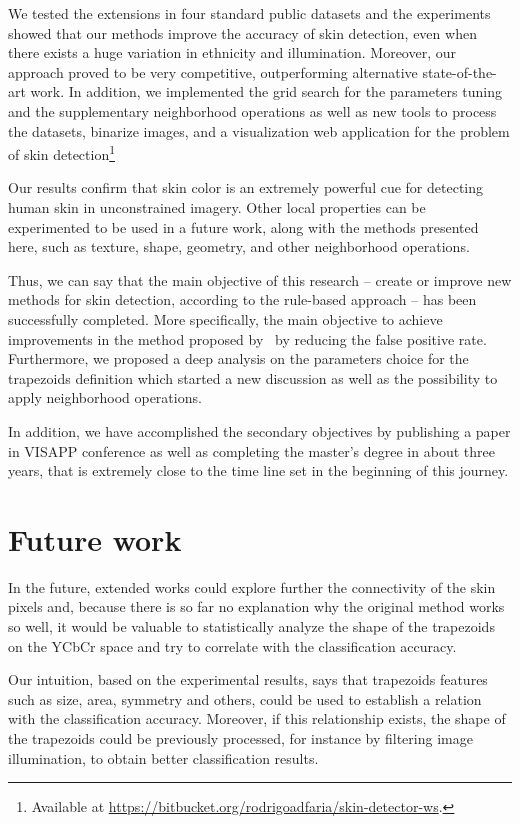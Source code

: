 We tested the extensions in four standard public datasets and the experiments showed that our methods improve the accuracy of skin detection, even when there exists a huge variation in ethnicity and illumination. Moreover, our approach proved to be very competitive, outperforming alternative state-of-the-art work. In addition, we implemented the grid search for the parameters tuning and the supplementary neighborhood operations as well as new tools to process the datasets, binarize images, and a visualization web application for the problem of skin detection\footnote{Available at \url{https://bitbucket.org/rodrigoadfaria/skin-detector-ws}.}

Our results confirm that skin color is an extremely powerful cue for detecting human skin in unconstrained imagery. Other local properties can be experimented to be used in a future work, along with the methods presented here, such as texture, shape, geometry, and other neighborhood operations.

Thus, we can say that the main objective of this research -- create or improve new methods for skin detection, according to the rule-based approach -- has been successfully completed. More specifically, the main objective to achieve improvements in the method proposed by~\citet{brancati:17} by reducing the false positive rate. Furthermore, we proposed a deep analysis on the parameters choice for the trapezoids definition which started a new discussion as well as the possibility to apply neighborhood operations.

In addition, we have accomplished the secondary objectives by publishing a paper in VISAPP conference as well as completing the master's degree in about three years, that is extremely close to the time line set in the beginning of this journey.


\section{Future work}
\label{sec:future_work}

In the future, extended works could explore further the connectivity of the skin pixels and, because there is so far no explanation why the original method works so well, it would be valuable to statistically analyze the shape of the trapezoids on the YCbCr space and try to correlate with the classification accuracy.

Our intuition, based on the experimental results, says that trapezoids features such as size, area, symmetry and others, could be used to establish a relation with the classification accuracy. Moreover, if  this relationship exists, the shape of the trapezoids could be previously processed, for instance by filtering image illumination, to obtain better classification results.

